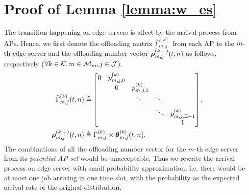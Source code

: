\section{ Proof of Lemma \ref{lemma:w_es} }
\label{append_2}
The transition happening on edge servers is affect by the arrival process from APs.
Hence, we first denote the offloading matrix $\bar{\Gamma}^{(k)}_{m,j}$ from each AP to the $m$-th edge server and the offloading number vector $\boldsymbol{\rho}^{(k,+)}_{m,j}({t,n})$ as follows, respectively ($\forall k\in\mathcal{K}, m\in\mathcal{M}_{m}, j\in\mathcal{J}$).
\begin{align}
    \bar{\Gamma}^{(k)}_{m,j}(t,n) &\triangleq
    \begin{bmatrix}
        0 & p^{(k)}_{m,j,0} &                 &        &                     \\
        & 0               & p^{(k)}_{m,j,1} &        &                     \\
        &                 & \ddots          & \ddots &                     \\
        &                 &                 & \ddots & p^{(k)}_{m,j,\Xi-1} \\
        &                 &                 &        & 1                   \\
    \end{bmatrix},
    \\
    \boldsymbol{\rho}^{(k,+)}_{m,j}({t,n}) &\triangleq \bar{\Gamma}^{(k)}_{m,j} \times \boldsymbol{\theta}^{(k)}_{m,j}({t,n}).
\end{align}
The combinations of all the offloading number vector for the $m$-th edge server from its \emph{potential AP set} would be unacceptable.
Thus we rewrite the arrival process on edge server with small probability approximation, i.e. there would be at most one job arriving in one time slot, with the probability as the expected arrival rate of the original distribution.
